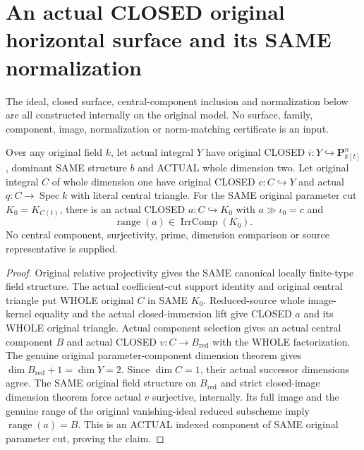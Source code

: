 \section{An actual CLOSED original horizontal surface and its SAME normalization}
The ideal, closed surface, central-component inclusion and normalization
below are all constructed internally on the original model. No surface,
family, component, image, normalization or norm-matching certificate is
an input.

\begin{lemma}
\label{lem:pl-gauss-original-surface-central-curve-component}
\leanok
Over any original field $k$, let actual integral $Y$ have original
CLOSED $i:Y\hookrightarrow\mathbf P^n_{k[t]}$, dominant SAME structure
$b$ and ACTUAL whole dimension two. Let original integral $C$ of whole
dimension one have original CLOSED $c:C\hookrightarrow Y$ and actual
$q:C\to\operatorname{Spec}k$ with literal central triangle.
For the SAME original parameter cut $K_0=K_{C(t)}$, there is an actual
CLOSED $a:C\hookrightarrow K_0$ with $a\gg\iota_0=c$ and
\[
 \operatorname{range}(a)\in\operatorname{IrrComp}(K_0).
\]
No central component, surjectivity, prime, dimension comparison or
source representative is supplied.
\end{lemma}
\begin{proof}
Original relative projectivity gives the SAME canonical locally
finite-type field structure. The actual coefficient-cut support
identity and original central triangle put WHOLE original $C$ in
SAME $K_0$. Reduced-source whole image-kernel equality and the actual
closed-immersion lift give CLOSED $a$ and its WHOLE original triangle.
Actual component selection gives an actual central component $B$
and actual CLOSED $v:C\to B_{\mathrm{red}}$ with the WHOLE factorization.
The genuine original parameter-component dimension theorem gives
$\dim B_{\mathrm{red}}+1=\dim Y=2$. Since $\dim C=1$, their actual
successor dimensions agree. The SAME original field structure on
$B_{\mathrm{red}}$ and strict closed-image dimension theorem force
actual $v$ surjective, internally. Its full image and the genuine
range of the original vanishing-ideal reduced subscheme imply
$\operatorname{range}(a)=B$. This is an ACTUAL indexed component of
SAME original parameter cut, proving the claim.
\end{proof}

